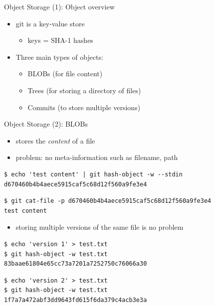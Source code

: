 \begin{frame}{Object Storage (1): Object overview}
  \begin{itemize}
    \item git is a key-value store
    \begin{itemize}
      \item keys = SHA-1 hashes
    \end{itemize}
    \item Three main types of objects:
    \begin{itemize}
      \item BLOBs (for file content)
      \item Trees (for storing a directory of files)
      \item Commits (to store multiple versions)
    \end{itemize}
  \end{itemize}
\end{frame}

\begin{frame}[fragile]{Object Storage (2): BLOBs}
  \begin{itemize}
    \item stores the \textit{content} of a file
    \item problem: no meta-information such as filename, path
  \end{itemize}
\begin{lstlisting}[style=ShellCmd]
$ echo 'test content' | git hash-object -w --stdin
d670460b4b4aece5915caf5c68d12f560a9fe3e4
\end{lstlisting}
\begin{lstlisting}[style=ShellCmd]
$ git cat-file -p d670460b4b4aece5915caf5c68d12f560a9fe3e4
test content
\end{lstlisting}
\begin{itemize}
  \item storing multiple versions of the same file is no problem
\end{itemize}

\begin{lstlisting}[style=ShellCmd]
$ echo 'version 1' > test.txt
$ git hash-object -w test.txt
83baae61804e65cc73a7201a7252750c76066a30
\end{lstlisting}

\begin{lstlisting}[style=ShellCmd]
$ echo 'version 2' > test.txt
$ git hash-object -w test.txt
1f7a7a472abf3dd9643fd615f6da379c4acb3e3a
\end{lstlisting}

\end{frame}

